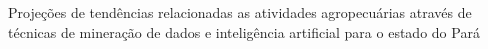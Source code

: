 
\pagestyle{fancy}
\fancyhf{}


\vspace{2cm}
\begin{center}
   
   Projeções de tendências relacionadas as atividades agropecuárias através de técnicas de mineração de dados e inteligência artificial para o estado do Pará
\end{center}

\tableofcontents
\newpage